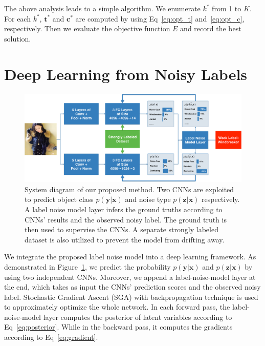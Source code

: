 \documentclass[10pt,twocolumn,letterpaper]{article}
\def\vec{\mathbf}
\begin{document}
The above analysis leads to a simple algorithm. We enumerate $k^*$ from 1 to $K$. For each $k^*$, $\vec{t}^*$ and $\vec{c}^*$ are computed by using Eq~\eqref{eq:opt_t} and~\eqref{eq:opt_c}, respectively. Then we evaluate the objective function $E$ and record the best solution.




\section{Deep Learning from Noisy Labels} %
\label{sec:weak_label_deep_learning}
\begin{figure}
\begin{center}
\includegraphics[width=0.9\linewidth]{figure/diagram.pdf}
\end{center}
\caption{System diagram of our proposed method. Two CNNs are exploited to predict object class $p(\vec{y}|\vec{x})$ and noise type $p(\vec{z}|\vec{x})$ respectively. A label noise model layer infers the ground truths according to CNNs' results and the observed noisy label. The ground truth is then used to supervise the CNNs. A separate strongly labeled dataset is also utilized to prevent the model from drifting away.}
\label{fig:framework}
\end{figure}

We integrate the proposed label noise model into a deep learning framework. As demonstrated in Figure~\ref{fig:framework}, we predict the probability $p(\vec{y}|\vec{x})$ and $p(\vec{z}|\vec{x})$ by using two independent CNNs. Moreover, we append a label-noise-model layer at the end, which takes as input the CNNs' prediction scores and the observed noisy label. Stochastic Gradient Ascent (SGA) with backpropagation technique is used to approximately optimize the whole network. In each forward pass, the label-noise-model layer computes the posterior of latent variables according to Eq~\eqref{eq:posterior}. While in the backward pass, it computes the gradients according to Eq~\eqref{eq:gradient}.
\end{document}

